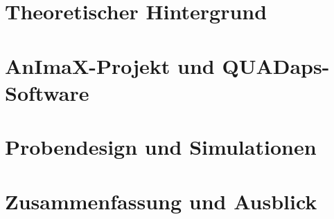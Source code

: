 \documentclass[12pt,a4paper,ngerman,twoside]{scrbook}
\begin{document}
\newpage
\thispagestyle{empty}
\setcounter{page}{0} %


\chapter{Theoretischer Hintergrund}	%





\chapter{AnImaX-Projekt und QUADaps-Software}	%




\chapter{Probendesign und Simulationen}	%





\chapter{Zusammenfassung und Ausblick}

\end{document}

